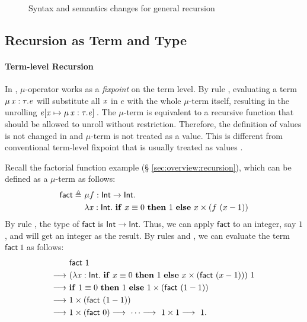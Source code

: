 \begin{figure}
	\gram{\newsyntax}\ottinterrule
	\ottdefnstepXXrec{}\ottinterrule
	\ottdefnexprXXrec{}
	\caption{Syntax and semantics changes for general recursion}
    \label{fig:rec:ext}
\end{figure}

\subsection{Recursion as Term and Type}
\paragraph{Term-level Recursion}

In \name, $ \mu $-operator works as a \emph{fixpoint} on the term
level. By rule , evaluating a term $\mu \, \mathit{x}  :  \tau  .  \mathit{e}$ will
substitute all $\mathit{x}$ in $e$ with the whole $ \mu $-term itself,
resulting in the unrolling $\mathit{e}  [  \mathit{x}  \mapsto  \mu \, \mathit{x}  :  \tau  .  \mathit{e}  ] \,$. The
$ \mu $-term is equivalent to a recursive function that should be
allowed to unroll without restriction. Therefore, the definition of
values is not changed in \name and $ \mu $-term is not treated as a
value. This is different from conventional term-level fixpoint that is
usually treated as values \cite{zombie:popl14}.

Recall the factorial function example (\S
\ref{sec:overview:recursion}), which can be defined as a $ \mu $-term
as follows:
\begin{align*}
    \mathsf{fact}  \triangleq ~  & \mu  f : \mathsf{Int}  \rightarrow  \mathsf{Int} . \\ &\lambda  \mathit{x}  :  \mathsf{Int}  .  ~\mathbf{if}~x  \equiv 0~\mathbf{then}~1~\mathbf{else}~x \times (f~(x
    - 1))
\end{align*}
By rule , the type of $\mathsf{fact}$ is $\mathsf{Int}  \rightarrow  \mathsf{Int}$. Thus, we can apply $\mathsf{fact}$ to an integer, say $1$, and
will get an integer as the result.  By rules  and
, we can evaluate the term $\mathsf{fact}~1$ as follows:
\begin{align*}
    &\mathsf{fact}~1 \\  \longrightarrow ~& (\lambda  \mathit{x}  :  \mathsf{Int}  .  ~\mathbf{if}~x
   \equiv 0~\mathbf{then}~1~\mathbf{else}~x \times (\mathsf{fact}~(x - 1)))~1
  \\  \longrightarrow ~ & \mathbf{if}~1  \equiv 0~\mathbf{then}~1~\mathbf{else}~1 \times
  (\mathsf{fact}~(1 - 1)) \\  \longrightarrow ~& 1 \times (\mathsf{fact}~(1-1))
  \\  \longrightarrow ~& 1 \times (\mathsf{fact}~0)  \longrightarrow ~ \dots  \longrightarrow ~ 1 \times
  1  \longrightarrow ~ 1.
\end{align*}

